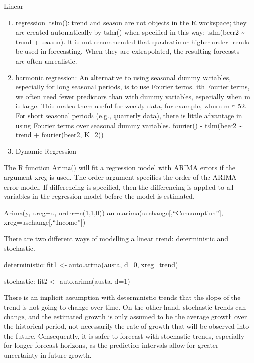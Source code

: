 \documentclass[]{book}
\theoremstyle{definition}
\theoremstyle{definition}
\theoremstyle{definition}
\theoremstyle{remark}
\begin{document}
Linear

\begin{enumerate}
\def\labelenumi{\arabic{enumi}.}
\setcounter{enumi}{9}
\item
  regression: tslm(): trend and season are not objects in the R
  workspace; they are created automatically by tslm() when specified in
  this way: tslm(beer2 \textasciitilde{} trend + season). It is not
  recommended that quadratic or higher order trends be used in
  forecasting. When they are extrapolated, the resulting forecasts are
  often unrealistic.
\item
  harmonic regression: An alternative to using seasonal dummy variables,
  especially for long seasonal periods, is to use Fourier terms. ith
  Fourier terms, we often need fewer predictors than with dummy
  variables, especially when m is large. This makes them useful for
  weekly data, for example, where m ≈ 52. For short seasonal periods
  (e.g., quarterly data), there is little advantage in using Fourier
  terms over seasonal dummy variables. fourier() - tslm(beer2
  \textasciitilde{} trend + fourier(beer2, K=2))
\item
  Dynamic Regression
\end{enumerate}

The R function Arima() will fit a regression model with ARIMA errors if
the argument xreg is used. The order argument specifies the order of the
ARIMA error model. If differencing is specified, then the differencing
is applied to all variables in the regression model before the model is
estimated.

Arima(y, xreg=x, order=c(1,1,0))
auto.arima(uschange{[},``Consumption''{]},
xreg=uschange{[},``Income''{]})

There are two different ways of modelling a linear trend: deterministic
and stochastic.

deterministic: fit1 \textless{}- auto.arima(austa, d=0, xreg=trend)

stochastic: fit2 \textless{}- auto.arima(austa, d=1)

There is an implicit assumption with deterministic trends that the slope
of the trend is not going to change over time. On the other hand,
stochastic trends can change, and the estimated growth is only assumed
to be the average growth over the historical period, not necessarily the
rate of growth that will be observed into the future. Consequently, it
is safer to forecast with stochastic trends, especially for longer
forecast horizons, as the prediction intervals allow for greater
uncertainty in future growth.
\end{document}
